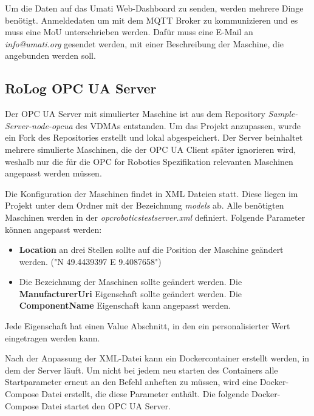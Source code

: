 \documentclass[a4paper, 12pt, oneside, toc=listofnumbered, bibliography=totoc]{scrbook}
\begin{document}
		Um die Daten auf das Umati Web-Dashboard zu senden, werden mehrere Dinge benötigt. Anmeldedaten um mit dem MQTT Broker zu kommunizieren und es muss eine \ac{MoU} unterschrieben werden. Dafür muss eine E-Mail an \textit{info@umati.org} gesendet werden, mit einer Beschreibung der Maschine, die angebunden werden soll. 
		
		\subsection{RoLog OPC UA Server}\label{ch:RoLogOPCUA}
		
		Der OPC UA Server mit simulierter Maschine ist aus dem Repository \textit{Sample-Server-node-opcua} des VDMAs entstanden. Um das Projekt anzupassen, wurde ein Fork des Repositories erstellt und lokal abgespeichert. Der Server beinhaltet mehrere simulierte Maschinen, die der OPC UA Client später ignorieren wird, weshalb nur die für die OPC for Robotics Spezifikation relevanten Maschinen angepasst werden müssen. 
		
		Die Konfiguration der Maschinen findet in XML Dateien statt. Diese liegen im Projekt unter dem Ordner mit der Bezeichnung \textit{models} ab. Alle benötigten Maschinen werden in der \textit{opcroboticstestserver.xml} definiert. Folgende Parameter können angepasst werden:
		
		\begin{itemize}
			\item \textbf{Location} an drei Stellen sollte auf die Position der Maschine geändert werden. ("N 49.4439397 E 9.4087658")
			\item Die Bezeichnung der Maschinen sollte geändert werden.
			\subitem Die \textbf{ManufacturerUri} Eigenschaft sollte geändert werden.
			\subitem Die \textbf{ComponentName} Eigenschaft kann angepasst werden. 
		\end{itemize}
		Jede Eigenschaft hat einen Value Abschnitt, in den ein personalisierter Wert eingetragen werden kann.
		
		Nach der Anpassung der XML-Datei kann ein Dockercontainer erstellt werden, in dem der Server läuft. Um nicht bei jedem neu starten des Containers alle Startparameter erneut an den Befehl anheften zu müssen, wird eine Docker-Compose Datei erstellt, die diese Parameter enthält. Die folgende Docker-Compose Datei startet den OPC UA Server.
		
		
		
\end{document}
